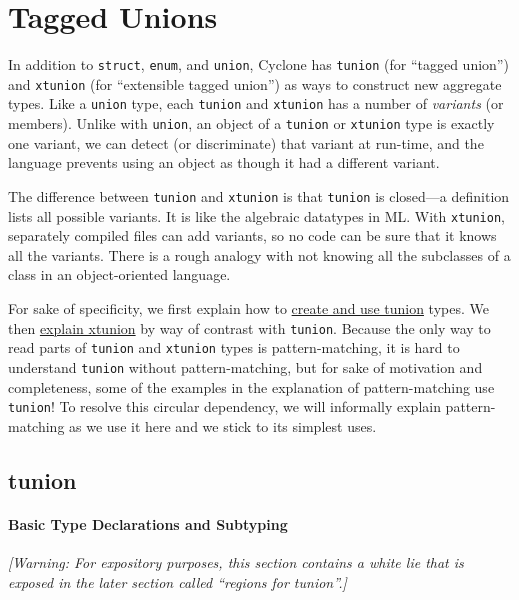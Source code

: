 \section{Tagged Unions}
\hypertarget{tagged_unions}{}

In addition to \texttt{struct}, \texttt{enum}, and \texttt{union}, Cyclone
has \texttt{tunion} (for ``tagged union'') and \texttt{xtunion} (for
``extensible tagged union'') as ways to construct new aggregate types.
Like a \texttt{union} type, each \texttt{tunion} and \texttt{xtunion} has a
number of \textit{variants} (or members).  Unlike with \texttt{union},
an object of a \texttt{tunion} or \texttt{xtunion} type is exactly one
variant, we can detect (or discriminate) that variant at run-time, and
the language prevents using an object as though it had a different
variant.

The difference between \texttt{tunion} and \texttt{xtunion} is that
\texttt{tunion} is closed---a definition lists all possible variants.
It is like the algebraic datatypes in ML\@. With \texttt{xtunion},
separately compiled files can add variants, so no code can be sure
that it knows all the variants.  There is a rough analogy with not
knowing all the subclasses of a class in an object-oriented language.

For sake of specificity, we first explain how to
\hyperlink{tunion_sec}{create and use tunion} types.  We then
\hyperlink{xtunion_sec}{explain xtunion} by way of contrast with
\texttt{tunion}.  Because the only way to read parts of \texttt{tunion}
and \texttt{xtunion} types is pattern-matching, it is hard to understand
\texttt{tunion} without pattern-matching, but for sake of motivation and
completeness, some of the examples in the explanation of
pattern-matching use \texttt{tunion}!  To resolve this circular
dependency, we will informally explain pattern-matching as we use it
here and we stick to its simplest uses.

\subsection{tunion}\hypertarget{tunion_sec}{}

\paragraph{Basic Type Declarations and Subtyping}
\textit{[Warning: For expository purposes, this section contains a
  white lie that is exposed in the later section called ``regions for
  tunion''.]}


